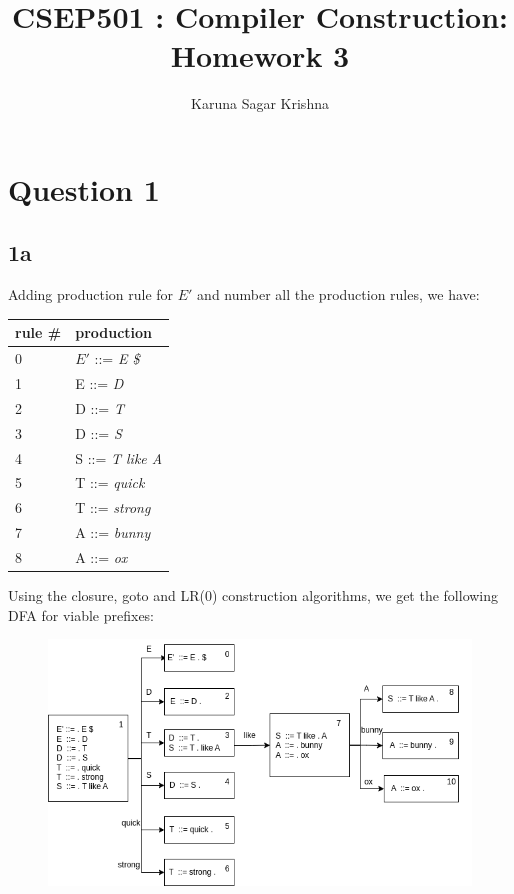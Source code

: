 \documentclass{article}
\title{CSEP501 : Compiler Construction: Homework 3}
\author{Karuna Sagar Krishna}
\begin{document}
    \maketitle

    \section*{Question 1}

    \subsection*{1a}
    Adding production rule for $E'$ and number all the production rules, we have:
    \begin{center}
        \begin{tabular}{ l l }
        \hline
        rule \# & production \\
        \hline
        0   &   $E'$  ::= \textit{E \$} \\
        1   &   E   ::= \textit{D} \\
        2   &   D   ::= \textit{T} \\
        3   &   D   ::= \textit{S} \\
        4   &   S   ::= \textit{T like A} \\
        5   &   T   ::= \textit{quick} \\
        6   &   T   ::= \textit{strong} \\
        7   &   A   ::= \textit{bunny} \\
        8   &   A   ::= \textit{ox} \\
        \end{tabular}
    \end{center}

    Using the closure, goto and LR(0) construction algorithms, we get the following DFA for viable prefixes:
    \begin{figure}[H]
        \includegraphics[width=1\textwidth]{hw3-1a.png}
    \end{figure}
\end{document}

